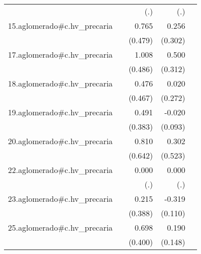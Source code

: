 {\begin{longtable}{l*{4}{D{.}{.}{-1}}}
            &                     &         (.)         &         (.)         &                     \\
\addlinespace
15.aglomerado#c.hv\_precaria&                     &       0.765         &       0.256         &                     \\
            &                     &     (0.479)         &     (0.302)         &                     \\
\addlinespace
17.aglomerado#c.hv\_precaria&                     &       1.008\sym{*}  &       0.500         &                     \\
            &                     &     (0.486)         &     (0.312)         &                     \\
\addlinespace
18.aglomerado#c.hv\_precaria&                     &       0.476         &       0.020         &                     \\
            &                     &     (0.467)         &     (0.272)         &                     \\
\addlinespace
19.aglomerado#c.hv\_precaria&                     &       0.491         &      -0.020         &                     \\
            &                     &     (0.383)         &     (0.093)         &                     \\
\addlinespace
20.aglomerado#c.hv\_precaria&                     &       0.810         &       0.302         &                     \\
            &                     &     (0.642)         &     (0.523)         &                     \\
\addlinespace
22.aglomerado#c.hv\_precaria&                     &       0.000         &       0.000         &                     \\
            &                     &         (.)         &         (.)         &                     \\
\addlinespace
23.aglomerado#c.hv\_precaria&                     &       0.215         &      -0.319\sym{**} &                     \\
            &                     &     (0.388)         &     (0.110)         &                     \\
\addlinespace
25.aglomerado#c.hv\_precaria&                     &       0.698         &       0.190         &                     \\
            &                     &     (0.400)         &     (0.148)         &                     \\

\end{longtable}}
